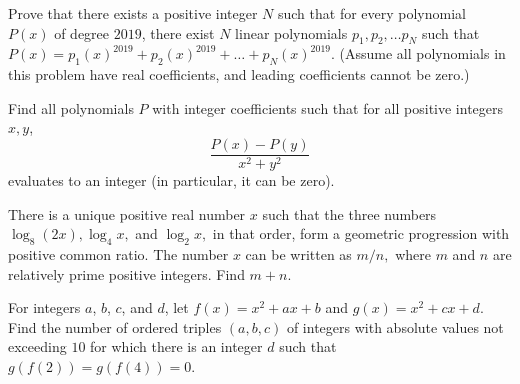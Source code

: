 \begin{question}[name={2018-2019 San Diego Power Contest, Winter, \href{https://artofproblemsolving.com/community/c6h2055914p14630375}{Problem 5}}]
	Prove that there exists a positive integer $N$ such that for every polynomial $P(x)$ of degree $2019$, there exist $N$ linear polynomials $p_1,p_2, \ldots p_N$ such that $P(x)=p_1(x)^{2019}+p_2(x)^{2019}+ \ldots + p_N(x)^{2019}$. (Assume all polynomials in this problem have real coefficients, and leading coefficients cannot be zero.)
\end{question}




%	



\begin{question}[name={2019-2020 San Diego Power Contest, Fall, \href{https://artofproblemsolving.com/community/c6h2036411p14381782}{Problem 3}}]
	Find all polynomials $P$ with integer coefficients such that for all positive integers $x,y$,$$\frac{P(x)-P(y)}{x^2+y^2}$$evaluates to an integer (in particular, it can be zero).
\end{question}




%	



\begin{question}[name={2020 AIME I, \href{https://artofproblemsolving.com/community/c4p14284233}{Problem 2}}]
	There is a unique positive real number $x$ such that the three numbers $\log_8(2x),\log_4x,$ and $\log_2x,$ in that order, form a geometric progression with positive common ratio. The number $x$ can be written as ${m}/{n},$ where $m$ and $n$ are relatively prime positive integers. Find $m+n$.	
\end{question}


%	












\begin{question}[name={2020 AIME I, \href{https://artofproblemsolving.com/community/c4p14285054}{Problem 11}}]
	For integers $a$, $b$, $c$, and $d$, let $f(x) = x^2 + ax + b$ and $g(x) = x^2 + cx + d$. Find the number of ordered triples $(a,b,c)$ of integers with absolute values not exceeding $10$ for which there is an integer $d$ such that $g(f(2)) = g(f(4)) = 0$.	
\end{question}



